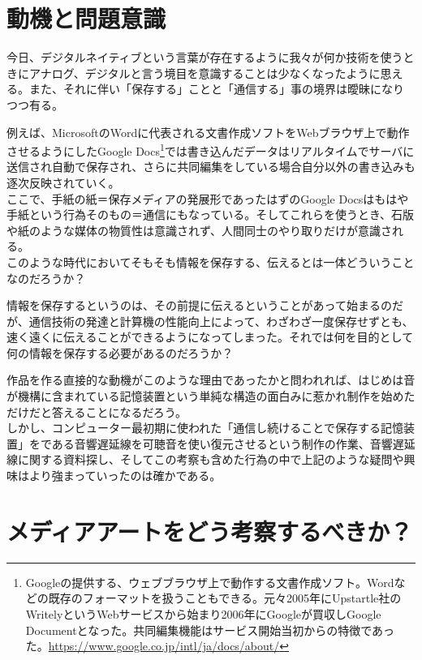 \documentclass[a4paper,report]{jsbook}
\begin{document}
\section{動機と問題意識}\label{ux52d5ux6a5fux3068ux554fux984cux610fux8b58}

今日、デジタルネイティブという言葉が存在するように我々が何か技術を使うときにアナログ、デジタルと言う境目を意識することは少なくなったように思える。また、それに伴い「保存する」ことと「通信する」事の境界は曖昧になりつつ有る。

例えば、MicrosoftのWordに代表される文書作成ソフトをWebブラウザ上で動作させるようにしたGoogle
Docs\footnote{Googleの提供する、ウェブブラウザ上で動作する文書作成ソフト。Wordなどの既存のフォーマットを扱うこともできる。元々2005年にUpstartle社のWritelyというWebサービスから始まり2006年にGoogleが買収しGoogle
  Documentとなった。共同編集機能はサービス開始当初からの特徴であった。\url{https://www.google.co.jp/intl/ja/docs/about/}}では書き込んだデータはリアルタイムでサーバに送信され自動で保存され、さらに共同編集をしている場合自分以外の書き込みも逐次反映されていく。\\
ここで、手紙の紙＝保存メディアの発展形であったはずのGoogle
Docsはもはや手紙という行為そのもの＝通信にもなっている。そしてこれらを使うとき、石版や紙のような媒体の物質性は意識されず、人間同士のやり取りだけが意識される。\\
このような時代においてそもそも情報を保存する、伝えるとは一体どういうことなのだろうか？

情報を保存するというのは、その前提に伝えるということがあって始まるのだが、通信技術の発達と計算機の性能向上によって、わざわざ一度保存せずとも、速く遠くに伝えることができるようになってしまった。それでは何を目的として何の情報を保存する必要があるのだろうか？

作品を作る直接的な動機がこのような理由であったかと問われれば、はじめは音が機構に含まれている記憶装置という単純な構造の面白みに惹かれ制作を始めただけだと答えることになるだろう。\\
しかし、コンピューター最初期に使われた「通信し続けることで保存する記憶装置」をである音響遅延線を可聴音を使い復元させるという制作の作業、音響遅延線に関する資料探し、そしてこの考察も含めた行為の中で上記のような疑問や興味はより強まっていったのは確かである。

\section{メディアアートをどう考察するべきか？}\label{ux30e1ux30c7ux30a3ux30a2ux30a2ux30fcux30c8ux3092ux3069ux3046ux8003ux5bdfux3059ux308bux3079ux304dux304b}
\end{document}
